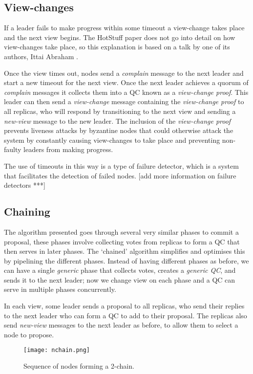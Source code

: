 \subsection{View-changes} \label{viewchange}
If a leader fails to make progress within some timeout a view-change takes place and the next view begins. The HotStuff paper does not go into detail on how view-changes take place, so this explanation is based on a talk by one of its authors, Ittai Abraham \cite{ittai}.

Once the view times out, nodes send a \textit{complain} message to the next leader and start a new timeout for the next view. Once the next leader achieves a quorum of \textit{complain} messages it collects them into a QC known as a \textit{view-change proof}. This leader can then send a \textit{view-change} message containing the \textit{view-change proof} to all replicas, who will respond by transitioning to the next view and sending a \textit{new-view} message to the new leader. The inclusion of the \textit{view-change proof} prevents liveness attacks by byzantine nodes that could otherwise attack the system by constantly causing view-changes to take place and preventing non-faulty leaders from making progress.

The use of timeouts in this way is a type of failure detector, which is a system that facilitates the detection of failed nodes. [add more information on failure detectors ***]

\subsection{Chaining} \label{chaining}
The algorithm presented goes through several very similar phases to commit a proposal, these phases involve collecting votes from replicas to form a QC that then serves in later phases. The `chained' algorithm simplifies and optimises this by pipelining the different phases. Instead of having different phases as before, we can have a single \textit{generic} phase that collects votes, creates a \textit{generic QC}, and sends it to the next leader; now we change view on each phase and a QC can serve in multiple phases concurrently.

In each view, some leader sends a proposal to all replicas, who send their replies to the next leader who can form a QC to add to their proposal. The replicas also send \textit{new-view} messages to the next leader as before, to allow them to select a node to propose.

\begin{figure}[h!]
\centering
\texttt{[image: nchain.png]}
\caption{Sequence of nodes forming a 2-chain.}
\label{nchain}
\end{figure}


